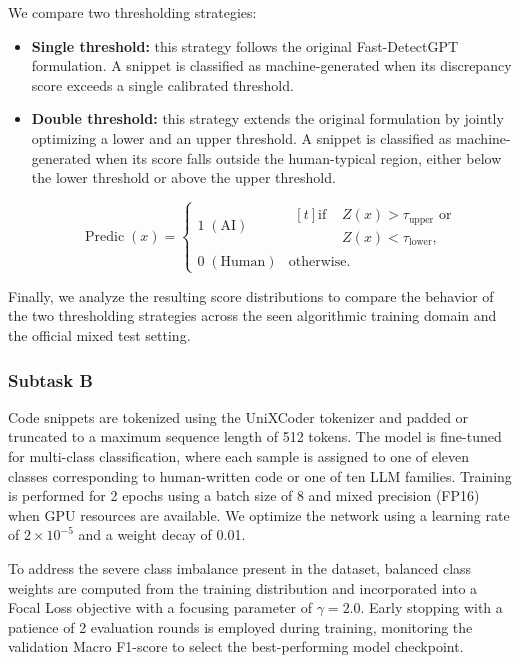 \documentclass[11pt]{article}
\begin{document}
We compare two thresholding strategies:
\begin{itemize}
  \item \textbf{Single threshold:} this strategy follows the original Fast-DetectGPT \cite{bao2024fastdetectgptefficientzeroshotdetection} formulation. A snippet is classified as machine-generated when its discrepancy score exceeds a single calibrated threshold.
  \item \textbf{Double threshold:} this strategy extends the original formulation by jointly optimizing a lower and an upper threshold. A snippet is classified as machine-generated when its score falls outside the human-typical region, either below the lower threshold or above the upper threshold.

    {\small
      \[
        \operatorname{Predic}(x) =
        \begin{cases}
          1 \; (\text{AI}) &
          \begin{aligned}[t]
            \text{if } & Z(x) > \tau_{\text{upper}} \text{ or} \\
            & Z(x) < \tau_{\text{lower}},
          \end{aligned} \\
          0 \; (\text{Human}) & \text{otherwise.}
        \end{cases}
      \]
    }
\end{itemize}

Finally, we analyze the resulting score distributions to compare the behavior of the two thresholding strategies across the seen algorithmic training domain and the official mixed test setting.


\subsubsection{ Subtask B}
Code snippets are tokenized using the UniXCoder \cite{guo2022unixcoderunifiedcrossmodalpretraining} tokenizer and padded or truncated to a maximum sequence length of 512 tokens. The model is fine-tuned for multi-class classification, where each sample is assigned to one of eleven classes corresponding to human-written code or one of ten LLM families. Training is performed for 2 epochs using a batch size of 8 and mixed precision (FP16) when GPU resources are available. We optimize the network using a learning rate of $2\times10^{-5}$ and a weight decay of 0.01.

To address the severe class imbalance present in the dataset, balanced class weights are computed from the training distribution and incorporated into a Focal Loss \cite{lin2018focallossdenseobject} objective with a focusing parameter of $\gamma=2.0$. Early stopping with a patience of 2 evaluation rounds is employed during training, monitoring the validation Macro F1-score to select the best-performing model checkpoint.
\end{document}
